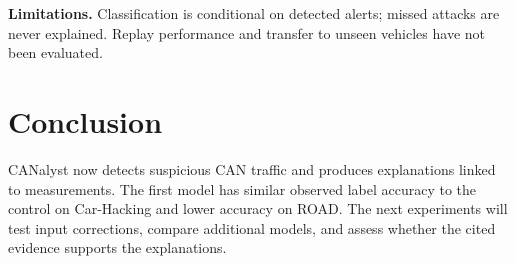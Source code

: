 \documentclass[sigconf]{acmart}
\begin{document}
\textbf{Limitations.} Classification is conditional on detected alerts; missed attacks are never explained. Replay performance and transfer to unseen vehicles have not been evaluated.

\section{Conclusion}
CANalyst now detects suspicious CAN traffic and produces explanations linked to measurements. The first model has similar observed label accuracy to the control on Car-Hacking and lower accuracy on ROAD. The next experiments will test input corrections, compare additional models, and assess whether the cited evidence supports the explanations.



\end{document}
